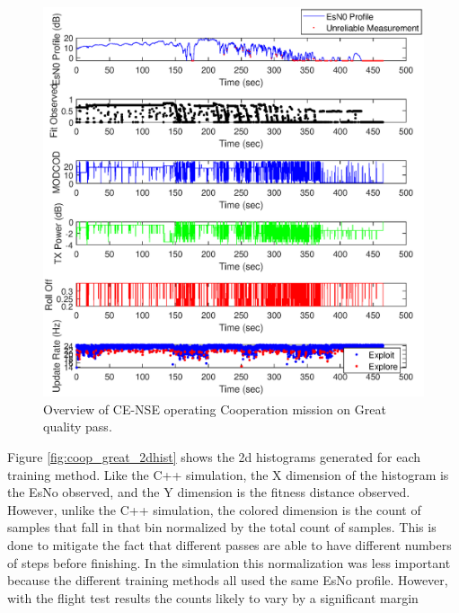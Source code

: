 \begin{figure}[ht]
\centering
\includegraphics[width=\textwidth]{figures/flight_results/coop_great_nse_overview.eps}
\caption{Overview of CE-NSE operating Cooperation mission on Great quality pass.}
\label{fig:flight_nse_coop_great_overview}
\end{figure}


\par Figure \ref{fig:coop_great_2dhist} shows the 2d histograms generated for each training method. Like the C++ simulation, the X dimension of the histogram is the EsNo observed, and the Y dimension is the fitness distance observed. However, unlike the C++ simulation, the colored dimension is the count of samples that fall in that bin normalized by the total count of samples. This is done to mitigate the fact that different passes are able to have different numbers of steps before finishing. In the simulation this normalization was less important because the different training methods all used the same EsNo profile. However, with the flight test results the counts likely to vary by a significant margin

